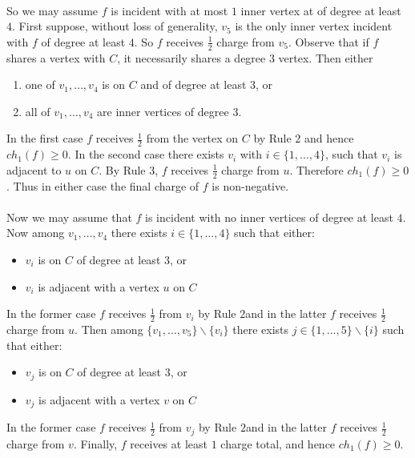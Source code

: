 \documentclass[letterpaper,12pt,oneside,onecolumn]{article}
\begin{document}
\paragraph{}
So we may assume $f$ is incident with at most $1$ inner vertex at of degree at least $4$. First suppose, without loss of generality, $v_5$ is the only inner vertex incident with $f$ of degree at least $4$. So $f$ receives $\frac{1}{2}$ charge from $v_5$. Observe that if $f$ shares a vertex with $C$, it necessarily shares a degree $3$ vertex. Then either 
\begin{enumerate}
	\item one of $v_1,\dots, v_4$ is on $C$ and of degree at least $3$, or
	\item all of $v_1, \dots, v_4$ are inner vertices of degree $3$.
\end{enumerate}
In the first case $f$ receives $\frac{1}{2}$ from the vertex on $C$ by Rule $2$ and hence $ch_1(f) \geq 0$. In the second case there exists $v_i$ with $i \in \{1,\dots, 4\}$, such that $v_i$ is adjacent to $u$ on $C$. By Rule $3$, $f$ receives $\frac{1}{2}$ charge from $u$. Therefore $ch_1(f) \geq 0$. Thus in either case the final charge of $f$ is non-negative.
\paragraph{}
Now we may assume that $f$ is incident with no inner vertices of degree at least $4$. Now among $v_1, \dots, v_4$ there exists $i \in \{1,\dots, 4\}$ such that either:
\begin{itemize}
	\item $v_i$ is on $C$ of degree at least $3$, or
	\item $v_i$ is adjacent with a vertex $u$ on $C$
\end{itemize}
In the former case $f$ receives $\frac{1}{2}$ from $v_i$ by Rule $2$and in the latter $f$ receives $\frac{1}{2}$ charge from $u$. Then among $\{v_1, \dots, v_5\} \backslash \{v_i\}$ there exists $j \in \{1,\dots, 5\}\backslash\{i\}$ such that either:
\begin{itemize}
	\item $v_j$ is on $C$ of degree at least $3$, or
	\item $v_j$ is adjacent with a vertex $v$ on $C$
\end{itemize}
In the former case $f$ receives $\frac{1}{2}$ from $v_j$ by Rule $2$and in the latter $f$ receives $\frac{1}{2}$ charge from $v$. Finally, $f$ receives at least $1$ charge total, and hence $ch_1(f) \geq 0$.
\end{document}
